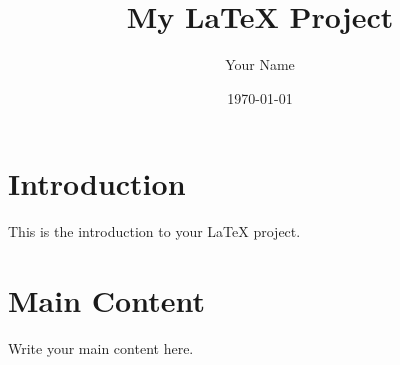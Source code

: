 \documentclass{article}
\title{My LaTeX Project}
\author{Your Name}
\date{\today}
\begin{document}
\maketitle

\section{Introduction}
This is the introduction to your LaTeX project.

\section{Main Content}
Write your main content here.
\end{document}
